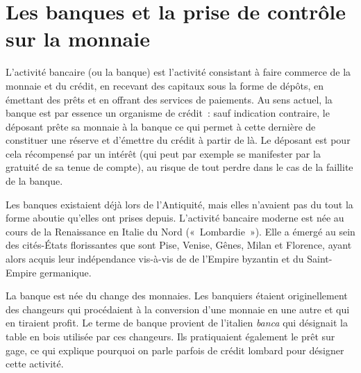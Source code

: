 \section*{Les banques et la prise de contrôle sur la monnaie}

L'activité bancaire (ou la banque) est l'activité consistant à faire commerce de la monnaie et du crédit, en recevant des capitaux sous la forme de dépôts, en émettant des prêts et en offrant des services de paiements. Au sens actuel, la banque est par essence un organisme de crédit~: sauf indication contraire, le déposant prête sa monnaie à la banque ce qui permet à cette dernière de constituer une réserve et d'émettre du crédit à partir de là. Le déposant est pour cela récompensé par un intérêt (qui peut par exemple se manifester par la gratuité de sa tenue de compte), au risque de tout perdre dans le cas de la faillite de la banque.



Les banques existaient déjà lors de l'Antiquité, mais elles n'avaient pas du tout la forme aboutie qu'elles ont prises depuis. L'activité bancaire moderne est née au cours de la Renaissance en Italie du Nord («~Lombardie~»). Elle a émergé au sein des cités-États florissantes que sont Pise, Venise, Gênes, Milan et Florence, ayant alors acquis leur indépendance vis-à-vis de de l'Empire byzantin et du Saint-Empire germanique.  %

La banque est née du change des monnaies. Les banquiers étaient originellement des changeurs qui procédaient à la conversion d'une monnaie en une autre et qui en tiraient profit. Le terme de banque provient de l'italien \emph{banca} qui désignait la table en bois utilisée par ces changeurs. Ils pratiquaient également le prêt sur gage, ce qui explique pourquoi on parle parfois de crédit lombard pour désigner cette activité.

